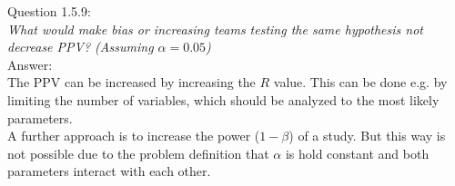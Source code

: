 
Question 1.5.9:\\	
\textsl{What would make bias or increasing teams testing the same hypothesis not decrease PPV? (Assuming $\alpha = 0.05$)}\\


Answer:\\
The PPV can be increased by increasing the $R$ value. This can be done e.g. by limiting the number of variables, which should be analyzed to the most likely parameters.\\

A further approach is to increase the power ($1-\beta$) of a study. But this way is not possible due to the problem definition that $\alpha$ is hold constant and both parameters interact with each other.
